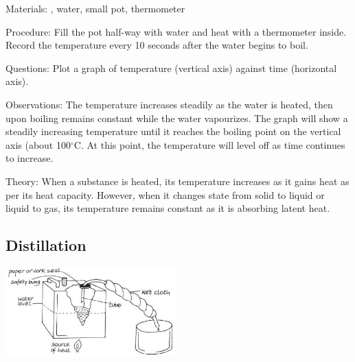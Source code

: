 \begin{multicols}{2}
\begin{description*}
\item[Materials:]{, water, small pot, thermometer}
\item[Procedure:]{Fill the pot half-way with water and heat with a thermometer inside. Record the temperature every 10 seconds after the water begins to boil.}
\item[Questions:]{Plot a graph of temperature (vertical axis) against time (horizontal axis).}
\item[Observations:]{The temperature increases steadily as the water is heated, then upon boiling remains constant while the water vapourizes. The graph will show a steadily increasing temperature until it reaches the boiling point on the vertical axis (about 100$^\circ$C. At this point, the temperature will level off as time continues to increase.}
\item[Theory:]{When a substance is heated, its temperature increases as it gains heat as per its heat capacity. However, when it changes state from solid to liquid or liquid to gas, its temperature remains constant as it is absorbing latent heat.}
\end{description*}

\subsection{Distillation}

\begin{center}
\includegraphics[width=0.49\textwidth]{./img/vso/distillation.png}
\end{center}


\end{multicols}
